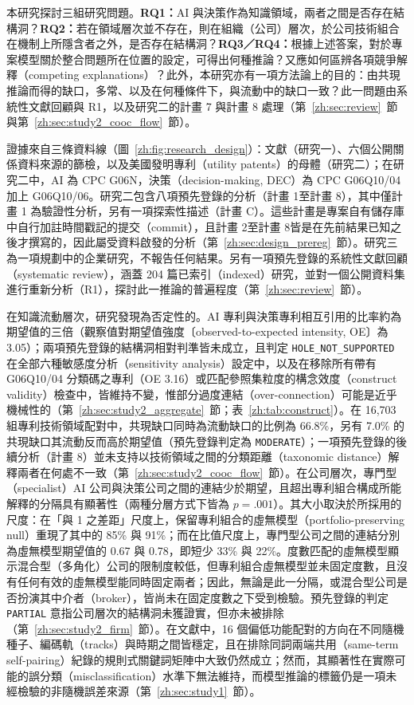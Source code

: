 本研究探討三組研究問題。\textbf{RQ1：}AI 與決策作為知識領域，兩者之間是否存在結構洞？\textbf{RQ2：}若在領域層次並不存在，則在組織（公司）層次，於公司技術組合在機制上所隱含者之外，是否存在結構洞？\textbf{RQ3／RQ4：}根據上述答案，對於專案模型關於整合問題所在位置的設定，可得出何種推論？又應如何區辨各項競爭解釋（competing explanations）？此外，本研究亦有一項方法論上的目的：由共現推論而得的缺口，多常、以及在何種條件下，與流動中的缺口一致？此一問題由系統性文獻回顧與 R1，以及研究二的計畫 7 與計畫 8 處理（第~\ref{zh:sec:review}~節與第~\ref{zh:sec:study2_cooc_flow}~節）。

證據來自三條資料線（圖~\ref{zh:fig:research_design}）：文獻（研究一）、六個公開關係資料來源的篩檢，以及美國發明專利（utility patents）的母體（研究二）；在研究二中，AI 為 CPC G06N，決策（decision-making, DEC）為 CPC G06Q10/04 加上 G06Q10/06。研究二包含八項預先登錄的分析（計畫 1至計畫 8），其中僅計畫 1 為驗證性分析，另有一項探索性描述（計畫 C）。這些計畫是專案自有儲存庫中自行加註時間戳記的提交（commit），且計畫 2至計畫 8皆是在先前結果已知之後才撰寫的，因此屬受資料啟發的分析（第~\ref{zh:sec:design_prereg}~節）。研究三為一項規劃中的企業研究，不報告任何結果。另有一項預先登錄的系統性文獻回顧（systematic review），涵蓋 204 篇已索引（indexed）研究，並對一個公開資料集進行重新分析（R1），探討此一推論的普遍程度（第~\ref{zh:sec:review}~節）。

在知識流動層次，研究發現為否定性的。AI 專利與決策專利相互引用的比率約為期望值的三倍（觀察值對期望值強度〔observed-to-expected intensity, OE〕為 3.05）；兩項預先登錄的結構洞相對判準皆未成立，且判定 \texttt{HOLE\_\allowbreak NOT\_\allowbreak SUPPORTED} 在全部六種敏感度分析（sensitivity analysis）設定中，以及在移除所有帶有 G06Q10/04 分類碼之專利（OE 3.16）或匹配參照集粒度的構念效度（construct validity）檢查中，皆維持不變，惟部分過度連結（over-connection）可能是近乎機械性的（第~\ref{zh:sec:study2_aggregate}~節；表~\ref{zh:tab:construct}）。在 16,703 組專利技術領域配對中，共現缺口同時為流動缺口的比例為 66.8\%，另有 7.0\% 的共現缺口其流動反而高於期望值（預先登錄判定為 \texttt{MODERATE}）；一項預先登錄的後續分析（計畫 8）並未支持以技術領域之間的分類距離（taxonomic distance）解釋兩者在何處不一致（第~\ref{zh:sec:study2_cooc_flow}~節）。在公司層次，專門型（specialist）AI 公司與決策公司之間的連結少於期望，且超出專利組合構成所能解釋的分隔具有顯著性（兩種分層方式下皆為 $p = .001$）。其大小取決於所採用的尺度：在「與 1 之差距」尺度上，保留專利組合的虛無模型（portfolio-preserving null）重現了其中的 85\% 與 91\%；而在比值尺度上，專門型公司之間的連結分別為虛無模型期望值的 0.67 與 0.78，即短少 33\% 與 22\%。度數匹配的虛無模型顯示混合型（多角化）公司的限制度較低，但專利組合虛無模型並未固定度數，且沒有任何有效的虛無模型能同時固定兩者；因此，無論是此一分隔，或混合型公司是否扮演其中介者（broker），皆尚未在固定度數之下受到檢驗。預先登錄的判定 \texttt{PARTIAL} 意指公司層次的結構洞未獲證實，但亦未被排除（第~\ref{zh:sec:study2_firm}~節）。在文獻中，16 個偏低功能配對的方向在不同隨機種子、編碼軌（tracks）與時期之間皆穩定，且在排除同詞兩端共用（same-term self-pairing）紀錄的規則式關鍵詞矩陣中大致仍然成立；然而，其顯著性在實際可能的誤分類（misclassification）水準下無法維持，而模型推論的標籤仍是一項未經檢驗的非隨機誤差來源（第~\ref{zh:sec:study1}~節）。

